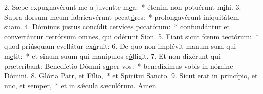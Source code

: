 2. Sæpe expugnavérunt me a juventte m\uline{e}a:~* étenim non potuérunt m\uline{i}hi.
3. Supra dorsum meum fabricavérunt pccat\uline{ó}res:~* prolongavérunt iniquitátem s\uline{u}am.
4. Dóminus justus concídit cervíces pccat\uline{ó}rum:~* confundántur et convertántur retrórsum omnes, qui odérunt S\uline{i}on.
5. Fiant sicut fœnm tect\uline{ó}rum:~* quod priúsquam evellátur ex\uline{á}ruit:
6. De quo non implévit manum sum qui m\uline{e}tit:~* et sinum suum qui manípulos c\uline{ó}lligit.
7. Et non dixérunt qui præteríbant: Benedíctio Dómni s\uline{u}per vos:~* benedíximus vobis in nómine D\uline{ó}mini.
8. Glória Patr, et F\uline{í}lio,~* et Spirítui S\uline{a}ncto.
9. Sicut erat in princípio, et nnc, et s\uline{e}mper,~* et in sǽcula sæculórum. \uline{A}men.
